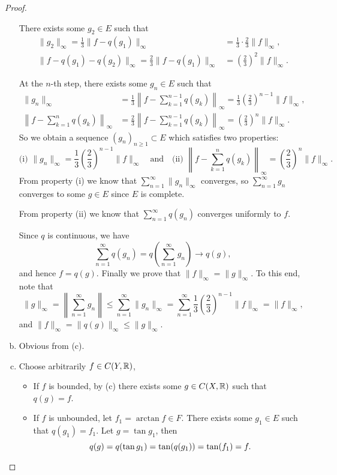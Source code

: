 \begin{proof}
\begin{enumerate}[(a)]
    There exists some $g_2\in E$ such that
    \begin{align*}
      \|g_2\|_{\infty}=\frac{1}{3}\|f-q(g_1)\|_{\infty}
        & = \frac{1}{3}\cdot\frac{2}{3}\|f\|_{\infty}, \\
      \|f-q(g_1)-q(g_2)\|_{\infty}=\frac{2}{3}\|f-q(g_1)\|_{\infty}
        & = \left(\frac{2}{3}\right)^2\|f\|_{\infty}.
    \end{align*}

    At the $n$-th step, there exists some $g_n\in E$ such that
    \begin{align*}
      \|g_n\|_{\infty}
        & = \frac{1}{3}\left\|f-\sum_{k=1}^{n-1}q(g_k)\right\|_{\infty}=\frac{1}{3}\left(\frac{2}{3}\right)^{n-1}\|f\|_{\infty}, \\
      \left\|f-\sum_{k=1}^nq(g_k)\right\|_{\infty}
        & = \frac{2}{3}\left\|f-\sum_{k=1}^{n-1}q(g_k)\right\|_{\infty}=\left(\frac{2}{3}\right)^n\|f\|_{\infty}.
    \end{align*}
    So we obtain a sequence $(g_n)_{n\geq 1}\subset E$ which satisfies two properties:
    \[\text{(i) } \|g_n\|_{\infty}=\frac{1}{3}\left(\frac{2}{3}\right)^{n-1}\|f\|_{\infty}
      \quad\text{and}\quad
      \text{(ii) } \left\|f-\sum_{k=1}^nq(g_k)\right\|_{\infty}=\left(\frac{2}{3}\right)^n\|f\|_{\infty}.\]
    From property (i) we know that $\sum_{n=1}^{\infty}\|g_n\|_{\infty}$ converges,
    so $\sum_{n=1}^{\infty}g_n$ converges to some $g\in E$ since $E$ is complete.

    From property (ii) we know that $\sum_{n=1}^{\infty}q(g_n)$ converges uniformly to $f$.

    Since $q$ is continuous, we have
    \[\sum_{n=1}^{\infty}q(g_n)=q\left(\sum_{n=1}^{\infty}g_n\right)\to q(g),\]
    and hence $f = q(g)$. Finally we prove that $\|f\|_\infty = \|g\|_\infty$.
    To this end, note that
    \[\|g\|_{\infty}=\left\|\sum_{n=1}^{\infty}g_n\right\|
      \leq \sum_{n=1}^{\infty}\|g_n\|_{\infty}
      = \sum_{n=1}^{\infty}\frac{1}{3}\left(\frac{2}{3}\right)^{n-1}\|f\|_{\infty}
      = \|f\|_{\infty},\]
    and $\|f\|_{\infty}=\|q(g)\|_{\infty}\leq\|g\|_{\infty}$.
  \item Obvious from (c).
  \item Choose arbitrarily $f\in C(Y,\mathbb{R})$,
    \begin{itemize}
      \item If $f$ is bounded, by (c) there exists some $g\in C(X,\mathbb{R})$ such that $q(g)=f$.
      \item If $f$ is unbounded, let $f_1 = \arctan f\in F$.
        There exists some $g_1\in E$ such that $q(g_1) = f_1$.
        Let $g = \tan g_1$, then
        \[q(g)=q(\tan g_1)=\tan(q(g_1))=\tan(f_1) = f.\qedhere\]
    \end{itemize}
\end{enumerate}
\end{proof}

